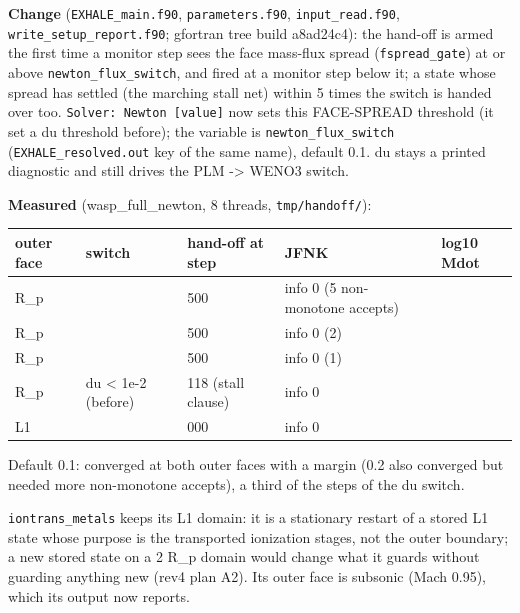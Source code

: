 \documentclass[english,a4paper]{my_memo}
\begin{document}
\textbf{Change} (\texttt{EXHALE\_main.f90}, \texttt{parameters.f90}, \texttt{input\_read.f90},
\texttt{write\_setup\_report.f90}; gfortran tree build a8ad24c4): the hand-off is armed
the first time a monitor step sees the face mass-flux spread (\texttt{fspread\_gate})
at or above \texttt{newton\_flux\_switch}, and fired at a monitor step below it; a state
whose spread has settled (the marching stall net) within 5 times the switch is
handed over too. \texttt{Solver:\ Newton\ {[}value{]}} now sets this FACE-SPREAD threshold
(it set a du threshold before); the variable is \texttt{newton\_flux\_switch}
(\texttt{EXHALE\_resolved.out} key of the same name), default 0.1. du stays a printed
diagnostic and still drives the PLM -\textgreater{} WENO3 switch.

\textbf{Measured} (wasp\_full\_newton, 8 threads, \texttt{tmp/handoff/}):

{\def\LTcaptype{none} %
{\small
\begin{longtable}[]{@{}>{\raggedright\arraybackslash}p{\dimexpr(\linewidth-10\tabcolsep)/5\relax}>{\raggedright\arraybackslash}p{\dimexpr(\linewidth-10\tabcolsep)/5\relax}>{\raggedright\arraybackslash}p{\dimexpr(\linewidth-10\tabcolsep)/5\relax}>{\raggedright\arraybackslash}p{\dimexpr(\linewidth-10\tabcolsep)/5\relax}>{\raggedright\arraybackslash}p{\dimexpr(\linewidth-10\tabcolsep)/5\relax}@{}}
\toprule\noalign{}
outer face & switch & hand-off at step & JFNK & log10 Mdot \\
\midrule\noalign{}
\endhead
\bottomrule\noalign{}
\endlastfoot
2 R\_p & 0.2 & 11 500 & info 0 (5 non-monotone accepts) & 13.28 \\
2 R\_p & 0.1 & 16 500 & info 0 (2) & 13.28 \\
2 R\_p & 0.03 & 21 500 & info 0 (1) & 13.28 \\
2 R\_p & du \textless{} 1e-2 (before) & 45 118 (stall clause) & info 0 & 13.28 \\
L1 & 0.1 & 7 000 & info 0 & 13.29 \\
\end{longtable}
}
}

Default 0.1: converged at both outer faces with a margin (0.2 also converged
but needed more non-monotone accepts), a third of the steps of the du switch.

\texttt{iontrans\_metals} keeps its L1 domain: it is a stationary restart of a stored
L1 state whose purpose is the transported ionization stages, not the outer
boundary; a new stored state on a 2 R\_p domain would change what it guards
without guarding anything new (rev4 plan A2). Its outer face is subsonic
(Mach 0.95), which its output now reports.
\end{document}
